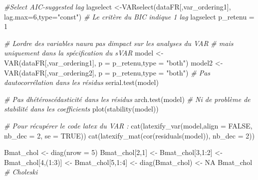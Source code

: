 \documentclass[
  10pt,
]{article}
\newenvironment{Shaded}{\begin{snugshade}}{\end{snugshade}}
\newcommand{\AttributeTok}[1]{\textcolor[rgb]{0.77,0.63,0.00}{#1}}
\newcommand{\CommentTok}[1]{\textcolor[rgb]{0.56,0.35,0.01}{\textit{#1}}}
\newcommand{\ConstantTok}[1]{\textcolor[rgb]{0.00,0.00,0.00}{#1}}
\newcommand{\DecValTok}[1]{\textcolor[rgb]{0.00,0.00,0.81}{#1}}
\newcommand{\FunctionTok}[1]{\textcolor[rgb]{0.00,0.00,0.00}{#1}}
\newcommand{\NormalTok}[1]{#1}
\newcommand{\OtherTok}[1]{\textcolor[rgb]{0.56,0.35,0.01}{#1}}
\newcommand{\SpecialCharTok}[1]{\textcolor[rgb]{0.00,0.00,0.00}{#1}}
\newcommand{\StringTok}[1]{\textcolor[rgb]{0.31,0.60,0.02}{#1}}
\begin{document}
\begin{Shaded}
\begin{Highlighting}[]
\CommentTok{\#Select AIC{-}suggested lag}
\NormalTok{lagselect }\OtherTok{\textless{}{-}}\FunctionTok{VARselect}\NormalTok{(dataFR[,var\_ordering1],}
                      \AttributeTok{lag.max=}\DecValTok{6}\NormalTok{,}\AttributeTok{type=}\StringTok{"const"}\NormalTok{)}
\CommentTok{\# Le critère du BIC indique 1 lag}
\NormalTok{lagselect}
\NormalTok{p\_retenu }\OtherTok{=} \DecValTok{1}

\CommentTok{\# L\textquotesingle{}ordre des variables n\textquotesingle{}aura pas d\textquotesingle{}impact sur les analyses du VAR}
\CommentTok{\# mais uniquement dans la spécification du sVAR}
\NormalTok{model }\OtherTok{\textless{}{-}} \FunctionTok{VAR}\NormalTok{(dataFR[,var\_ordering1],}
           \AttributeTok{p =}\NormalTok{ p\_retenu,}\AttributeTok{type =} \StringTok{"both"}\NormalTok{)}
\NormalTok{model2 }\OtherTok{\textless{}{-}} \FunctionTok{VAR}\NormalTok{(dataFR[,var\_ordering2],}
             \AttributeTok{p =}\NormalTok{ p\_retenu,}\AttributeTok{type =} \StringTok{"both"}\NormalTok{)}
\CommentTok{\# Pas d\textquotesingle{}autocorrélation dans les résidus}
\FunctionTok{serial.test}\NormalTok{(model)}

\CommentTok{\# Pas d\textquotesingle{}hétéroscédasticité dans les résidus}
\FunctionTok{arch.test}\NormalTok{(model)}
\CommentTok{\# Ni de problème de stabilité dans les coefficients}
\FunctionTok{plot}\NormalTok{(}\FunctionTok{stability}\NormalTok{(model))}

\CommentTok{\# Pour récupérer le code latex du VAR :}
\FunctionTok{cat}\NormalTok{(}\FunctionTok{latexify\_var}\NormalTok{(model,}\AttributeTok{align =} \ConstantTok{FALSE}\NormalTok{, }\AttributeTok{nb\_dec =} \DecValTok{2}\NormalTok{, }\AttributeTok{se =} \ConstantTok{TRUE}\NormalTok{))}
\FunctionTok{cat}\NormalTok{(}\FunctionTok{latexify\_mat}\NormalTok{(}\FunctionTok{cor}\NormalTok{(}\FunctionTok{residuals}\NormalTok{(model)), }\AttributeTok{nb\_dec =} \DecValTok{2}\NormalTok{))}


\NormalTok{Bmat\_chol }\OtherTok{\textless{}{-}} \FunctionTok{diag}\NormalTok{(}\AttributeTok{nrow =} \DecValTok{5}\NormalTok{)}
\NormalTok{Bmat\_chol[}\DecValTok{2}\NormalTok{,}\DecValTok{1}\NormalTok{] }\OtherTok{\textless{}{-}}\NormalTok{ Bmat\_chol[}\DecValTok{3}\NormalTok{,}\DecValTok{1}\SpecialCharTok{:}\DecValTok{2}\NormalTok{] }\OtherTok{\textless{}{-}} 
\NormalTok{    Bmat\_chol[}\DecValTok{4}\NormalTok{,(}\DecValTok{1}\SpecialCharTok{:}\DecValTok{3}\NormalTok{)] }\OtherTok{\textless{}{-}}\NormalTok{ Bmat\_chol[}\DecValTok{5}\NormalTok{,}\DecValTok{1}\SpecialCharTok{:}\DecValTok{4}\NormalTok{] }\OtherTok{\textless{}{-}} 
    \FunctionTok{diag}\NormalTok{(Bmat\_chol) }\OtherTok{\textless{}{-}} \ConstantTok{NA}
\NormalTok{Bmat\_chol }\CommentTok{\# Choleski}


\end{Highlighting}
\end{Shaded}
\end{document}
